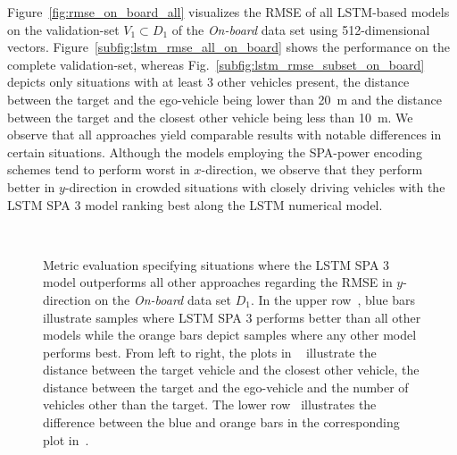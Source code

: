 Figure~\ref{fig:rmse_on_board_all} visualizes the \ac{RMSE} of all \ac{LSTM}-based models on the validation-set $V_1 \subset D_1$ of the \emph{On-board} data set using \num{512}-dimensional vectors.
Figure~\ref{subfig:lstm_rmse_all_on_board} shows the performance on the complete validation-set, whereas Fig.~\ref{subfig:lstm_rmse_subset_on_board} depicts only situations with at least \num{3} other vehicles present, the distance between the target and the ego-vehicle being lower than \SI{20}{\meter} and the distance between the target and the closest other vehicle being less than \SI{10}{\meter}.
We observe that all approaches yield comparable results with notable differences in certain situations.
Although the models employing the \ac{SPA}-power encoding schemes tend to perform worst in $x$-direction, we observe that they perform better in $y$-direction in crowded situations with closely driving vehicles with the \acs{LSTM} \acs{SPA} \num{3} model ranking best along the \acs{LSTM} numerical model.
\begin{figure}[t!]
    \centering
    \\
    \caption{Metric evaluation specifying situations where the \ac{LSTM} \acs{SPA} \num{3} model outperforms all other approaches regarding the \acs{RMSE} in $y$-direction on the \emph{On-board} data set $D_1$.
      In the upper row~\protect{}, blue bars illustrate samples where \ac{LSTM} \ac{SPA} \num{3} performs better than all other models while the orange bars depict samples where any other model performs best.
      From left to right, the plots in ~\protect{} illustrate the distance between the target vehicle and the closest other vehicle, the distance between the target and the ego-vehicle and the number of vehicles other than the target.
      The lower row~\protect{} illustrates the difference between the blue and orange bars in the corresponding plot in~\protect{}.
    }
    \label{fig:histograms_on_board}
\end{figure}

